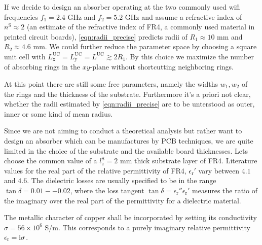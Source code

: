If we decide to design an absorber operating at the two commonly used wifi frequencies $f_1=2.4$ GHz and $f_2=5.2$ GHz and assume a refractive index of $n^\mathrm{S}\approx 2$ (an estimate of the refractive index of FR4, a commonly used material in printed circuit boards), \cref{eqn:radii_precise} predicts radii of $R_1\approx10$ mm and $R_2\approx 4.6$ mm. We could further reduce the parameter space by choosing a square unit cell with $L^\mathrm{UC}_\mathrm{x}=L^\mathrm{UC}_\mathrm{y}=L^\mathrm{UC}\gtrsim 2R_1$. By this choice we maximize the number of absorbing rings in the $xy$-plane without shortcutting neighboring rings.

At this point there are still some free parameters, namely the widths $w_1, w_2$ of the rings and the thickness of the substrate. Furthermore it's a priori not clear, whether the radii estimated by \cref{eqn:radii_precise} are to be unterstood as outer, inner or some kind of mean radius.

Since we are not aiming to conduct a theoretical analysis but rather want to design an absorber which can be manufactures by PCB techniques, we are quite limited in the choice of the substrate and the available board thicknesses. Lets choose the common value of a $l_z^\mathrm{S}=2$ mm thick substrate layer of FR4. Literature values for the real part of the relative permittivity of FR4, $\epsilon_\mathrm{r}'$ vary between $4.1$ and $4.6$. The dielectric losses are usually specified to be in the range $\tan \delta=0.01--0.02$, where the loss tangent $\tan\delta=\epsilon_\mathrm{r}''\epsilon_\mathrm{r}'$ measures the ratio of the imaginary over the real part of the permittivity for a dielectric material.

The metallic character of copper shall be incorporated by setting its conductivity $\sigma=56\times 10^6$ S/m. This corresponds to a purely imaginary relative permittivity $\epsilon_\mathrm{r}= \mathrm{i} \sigma$.

